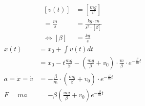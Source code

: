 \documentclass[12pt,a4paper,notitlepage]{article}
\title{}
\begin{document}
\begin{align}
\left[v(t)\right]&=\left[\frac{mg}{\beta}\right]\\
=\frac{m}{s}&=\frac{kg\cdot m}{s^2\cdot[\beta]}\\
\Leftrightarrow[\beta]&=\frac{kg}{s}
\end{align}
\begin{align}
x(t)&=x_0+\int v(t)dt\\
&=x_0-t\frac{mg}{\beta}-\left(\frac{mg}{\beta}+v_0\right)\cdot\frac{m}{\beta}\cdot e^{-\frac{\beta}{m}t}\\
a=\ddot x=\dot v&=-\frac{\beta}{m}\cdot\left(\frac{mg}{\beta}+v_0\right)\cdot e^{-\frac{\beta}{m}t}\\
F=ma&=-\beta\left(\frac{mg}{\beta}+v_0\right)e^{-\frac{\beta}{m}t}
\end{align}
\end{document}
